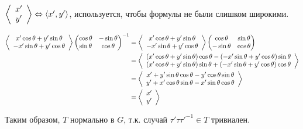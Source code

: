 \begin{solution}
    \begin{remark}
        \(\ev{\begin{array}{c}
                x' \\
                y'
            \end{array}} \Leftrightarrow \ev{x', y'}\), используется, чтобы формулы не были слишком широкими.
    \end{remark}
    \begin{align*}
        \ev{\begin{array}{c}
                x' \cos \theta + y' \sin \theta \\
                - x' \sin \theta + y' \cos \theta
            \end{array}} \begin{pmatrix}
            \cos \theta & - \sin \theta \\
            \sin \theta & \cos \theta
        \end{pmatrix}^{ - 1}
         & = \ev{\begin{array}{c}
                x' \cos \theta + y' \sin \theta \\
                - x' \sin \theta + y' \cos \theta
            \end{array}} \begin{pmatrix}
            \cos \theta  & \sin \theta \\
            -\sin \theta & \cos \theta
        \end{pmatrix} \\
         & = \ev{\begin{array}{c}
                (x' \cos \theta + y' \sin \theta) \cos \theta - (- x' \sin \theta + y' \cos \theta) \sin \theta \\
                (x' \cos \theta + y' \sin \theta) \sin \theta + (- x' \sin \theta + y' \cos \theta) \cos \theta
            \end{array}}                            \\
         & = \ev{\begin{array}{c}
                x' + y' \sin \theta \cos \theta - y' \cos \theta \sin \theta \\
                y' + x' \cos \theta \sin \theta - x' \sin \theta \cos \theta
            \end{array}}                            \\
         & = \ev{\begin{array}{c}
                x' \\
                y'
            \end{array}}                            \\
    \end{align*}

    Таким образом, \(T\) нормально в \(G\), т.к. случай \(\tau'\tau\tau'^{ - 1} \in T\) тривиален.
\end{solution}


